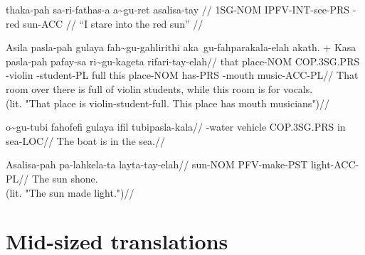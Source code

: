 \ex
\begingl
\gla thaka-pah sa-ri-fathas-a   a\~{}gu-ret   asalisa-tay //
\glb 1SG-NOM   IPFV-INT-see-PRS \agradj{}-red sun-ACC //
\glft ``I stare into the red sun'' //
\endgl
\xe

\ex
\begingl
\gla Asila pasla-pah gulaya      fah\~{}gu-gahlirithi aka~gu-fahparakala-elah akath.
+ Kasa pasla-pah pafay-sa ri\~{}gu-kageta  rifari-tay-elah//
\glb that  place-NOM COP.3SG.PRS \agradj{}-violin    \agradj{}-student-PL      full   this place-NOM has-PRS  \agradj{}-mouth music-ACC-PL//
\glft That room over there is full of violin students, while this room is for vocals. \\
     (lit. "That place is violin-student-full. This place has mouth musicians")//
\endgl
\xe

\ex
\begingl
\gla  o\~{}gu-tubi    fahofefi gulaya      ifil tubipasla-kala//
\glb  \agradj{}-water vehicle  COP.3SG.PRS in   sea-LOC//
\glft The boat is in the sea.//
\endgl
\xe

\ex
\begingl
\gla  Asalisa-pah pa-lahkela-ta layta-tay-elah//
\glb  sun-NOM     PFV-make-PST  light-ACC-PL//
\glft The sun shone. \\
      (lit. "The sun made light.")//
\endgl
\xe



\chapter{Mid-sized translations}

\newpage

\newpage


\newpage
